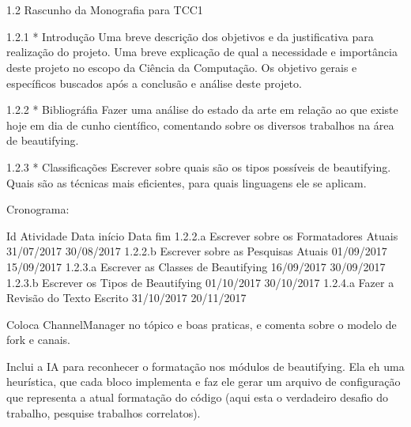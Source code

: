 
%

\chapter[]{}


1.2      Rascunho da Monografia para TCC1

1.2.1    * Introdução       Uma breve descrição dos objetivos e da
           justificativa para realização do projeto. Uma breve explicação de
           qual a necessidade e importância deste projeto no escopo da
           Ciência da Computação. Os objetivo gerais e específicos buscados
           após a conclusão e análise deste projeto.

1.2.2    * Bibliográfia     Fazer uma análise do estado da arte em relação
         ao que existe hoje em dia de cunho científico, comentando sobre os
         diversos trabalhos na área de beautifying.

1.2.3    * Classificações   Escrever sobre quais são os tipos possíveis de
         beautifying. Quais são as técnicas mais eficientes, para quais
         linguagens ele se aplicam.

Cronograma:

Id      Atividade                               Data início    Data fim
1.2.2.a Escrever sobre os Formatadores Atuais   31/07/2017     30/08/2017
1.2.2.b Escrever sobre as Pesquisas Atuais      01/09/2017     15/09/2017
1.2.3.a Escrever as Classes de Beautifying      16/09/2017     30/09/2017
1.2.3.b Escrever os Tipos de Beautifying        01/10/2017     30/10/2017
1.2.4.a Fazer a Revisão do Texto Escrito        31/10/2017     20/11/2017

Coloca ChannelManager no tópico e boas praticas, e comenta sobre o modelo de
fork e canais.

Inclui a IA para reconhecer o formatação nos módulos de beautifying. Ela eh
uma heurística, que cada bloco implementa e faz ele gerar um arquivo de
configuração que representa a atual formatação do código (aqui esta o
verdadeiro desafio do trabalho, pesquise trabalhos correlatos).

